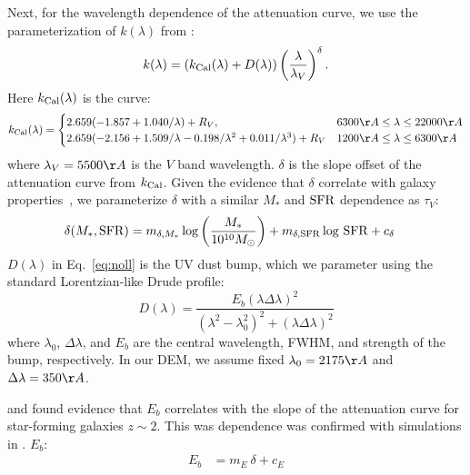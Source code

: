 Next, for the wavelength dependence of the attenuation curve, we use the
parameterization of $k(\lambda)$ from \cite{noll2009}: 
\begin{equation} \label{eq:noll}
    k(\lambda) = \left(k_{\rm Cal}(\lambda) + D(\lambda)\right) \left(
    \frac{\lambda}{\lambda_V} \right)^\delta.
\end{equation}
Here $k_{\rm Cal}(\lambda)$ is the \cite{calzetti2001} curve: 
\[
    k_{\rm Cal}(\lambda) = 
    \begin{cases} 
        2.659 (-1.857 + 1.040/\lambda) + R_V, & 6300 \AA \le \lambda \le
        22000 \AA \\ 
        2.659 (-2.156 + 1.509/\lambda - 0.198/\lambda^2 + 0.011/\lambda^3) +
        R_V & 1200 \AA \le \lambda \le 6300 \AA
    \end{cases}
\]
where $\lambda_V = 5500 \AA$ is the $V$ band wavelength. $\delta$ is the slope
offset of the attenuation curve from $k_{\rm Cal}$. Given the evidence that
$\delta$ correlate with galaxy properties~\citep[\eg][]{leja2017, salim2018},
we parameterize $\delta$ with a similar $M_*$ and ${\rm SFR}$ dependence as
$\tau_V$:  
\begin{align}
    \delta(M_*, {\rm SFR}) &= m_{\delta,M_*} \log \left(\frac{M_*}{10^{10}
    M_\odot}\right) + m_{\delta,{\rm SFR}} \log\,{\rm SFR} + c_\delta 
\end{align}
$D(\lambda)$ in Eq.~\ref{eq:noll} is the UV dust bump, which we parameter using
the standard Lorentzian-like Drude profile:
\begin{equation}
    D(\lambda) = \frac{E_b(\lambda \Delta \lambda)^2}{(\lambda^2 -
    \lambda_0^2)^2 + (\lambda \Delta \lambda)^2}
\end{equation}
where $\lambda_0$, $\Delta \lambda$, and $E_b$ are the central wavelength,
FWHM, and strength of the bump, respectively. In our DEM, we assume fixed 
$\lambda_0 = 2175 \AA$ and $\Delta \lambda = 350\AA$. 


\cite{kriek2013} and \cite{tress2018} found evidence that $E_b$ correlates with
the slope of the attenuation curve for star-forming galaxies $z\sim2$. This was
dependence was confirmed with simulations in \cite{naranyanan2018}. $E_b$: 
\begin{align} \label{eq:bump_amp}
    E_b &= m_E~\delta + c_E
\end{align}

